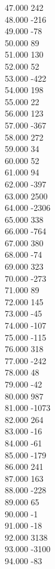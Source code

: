 { 47.000	242 \\
 48.000	-216 \\
 49.000	-78 \\
 50.000	89 \\
 51.000	130 \\
 52.000	52 \\
 53.000	-422 \\
 54.000	198 \\
 55.000	22 \\
 56.000	123 \\
 57.000	-367 \\
 58.000	272 \\
 59.000	34 \\
 60.000	52 \\
 61.000	94 \\
 62.000	-397 \\
 63.000	2500 \\
 64.000	-2306 \\
 65.000	338 \\
 66.000	-764 \\
 67.000	380 \\
 68.000	-74 \\
 69.000	323 \\
 70.000	-273 \\
 71.000	89 \\
 72.000	145 \\
 73.000	-45 \\
 74.000	-107 \\
 75.000	-115 \\
 76.000	318 \\
 77.000	-242 \\
 78.000	48 \\
 79.000	-42 \\
 80.000	987 \\
 81.000	-1073 \\
 82.000	264 \\
 83.000	-16 \\
 84.000	-61 \\
 85.000	-179 \\
 86.000	241 \\
 87.000	163 \\
 88.000	-228 \\
 89.000	65 \\
 90.000	-1 \\
 91.000	-18 \\
 92.000	3138 \\
 93.000	-3100 \\
 94.000	-83 \\
}
